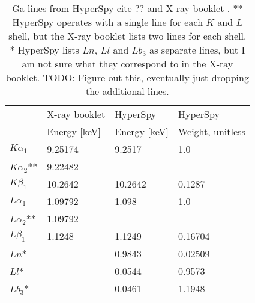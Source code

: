 
\begin{table}[tbp]
    \centering
    \caption{
        Ga lines from HyperSpy cite ?? and X-ray booklet \cite{thompson_x-ray_2004}.
        ** HyperSpy operates with a single line for each $K$ and $L$ shell, but the X-ray booklet lists two lines for each shell.
        * HyperSpy lists $Ln$, $Ll$ and $Lb_3$ as separate lines, but I am not sure what they correspond to in the X-ray booklet.
        TODO: Figure out this, eventually just dropping the additional lines.
    }
    \label{tab:theory:Ga-lines}
    \begin{tabular}{llll}
                       & X-ray booklet & HyperSpy     & HyperSpy         \\
                       & Energy [keV]  & Energy [keV] & Weight, unitless \\
        \hline
        $K \alpha_1$   & 9.25174       & 9.2517       & 1.0              \\
        $K \alpha_2$** & 9.22482       &              &                  \\
        $K \beta_1$    & 10.2642       & 10.2642      & 0.1287           \\
        $L \alpha_1$   & 1.09792       & 1.098        & 1.0              \\
        $L \alpha_2$** & 1.09792       &              &                  \\
        $L \beta_1$    & 1.1248        & 1.1249       & 0.16704          \\
        $Ln$*          &               & 0.9843       & 0.02509          \\
        $Ll$*          &               & 0.0544       & 0.9573           \\
        $Lb_3$*        &               & 0.0461       & 1.1948
    \end{tabular}

\end{table}